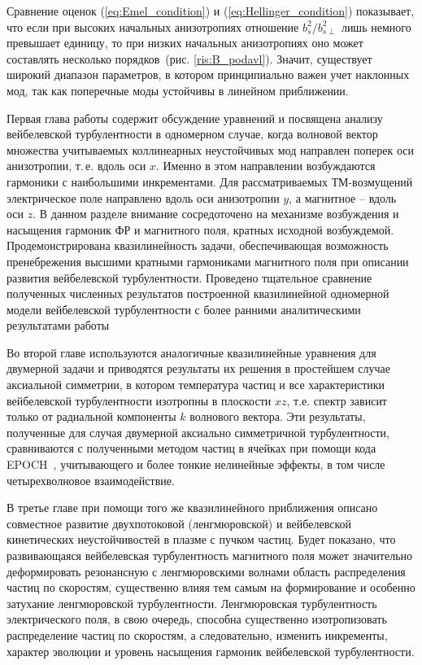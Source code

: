 Сравнение оценок (\ref{eq:Emel_condition}) и (\ref{eq:Hellinger_condition}) показывает, что если при высоких начальных анизотропиях отношение $ b_{s}^2/ b_{s\perp}^2$ лишь немного превышает единицу, то при низких начальных анизотропиях оно может составлять несколько порядков~(рис. \ref{ris:B_podavl}). Значит, существует широкий диапазон параметров, в котором принципиально важен учет наклонных мод, так как поперечные моды устойчивы в линейном приближении.

Первая глава работы содержит обсуждение уравнений и посвящена анализу вейбелевской турбулентности в одномерном случае, когда волновой вектор множества учитываемых коллинеарных неустойчивых мод направлен поперек оси анизотропии, т.\,е. вдоль оси $x$. Именно в этом направлении возбуждаются гармоники с наибольшими инкрементами. Для рассматриваемых ТМ-возмущений электрическое поле направлено вдоль оси анизотропии $y$, а магнитное -- вдоль оси $z$.  В данном разделе внимание сосредоточено на механизме возбуждения и насыщения гармоник ФР и магнитного поля, кратных исходной возбуждемой. Продемонстрирована квазилинейность задачи, обеспечивающая возможность пренебрежения высшими кратными гармониками магнитного поля при описании развития вейбелевской турбулентности. Проведено тщательное сравнение полученных численных результатов построенной квазилинейной одномерной модели вейбелевской турбулентности с более ранними аналитическими результатами работы~\cite{Pokhotelov2011}

Во второй главе используются аналогичные квазилинейные уравнения для двумерной задачи и приводятся результаты их решения в простейшем случае аксиальной симметрии, в котором температура частиц и все характеристики вейбелевской турбулентности изотропны в плоскости $xz$, т.е. спектр зависит только от радиальной компоненты $k$ волнового вектора. Эти результаты, полученные для случая двумерной аксиально симметричной турбулентности, сравниваются с полученными методом частиц в ячейках при помощи кода EPOCH~\cite{Arber2015}, учитывающего и более тонкие нелинейные эффекты, в том числе четырехволновое взаимодействие. 

В третье главе при помощи того же квазилинейного приближения описано совместное развитие двухпотоковой (ленгмюровской) и вейбелевской кинетических неустойчивостей в плазме с пучком частиц. Будет показано, что развивающаяся вейбелевская турбулентность магнитного поля может значительно деформировать резонансную с ленгмюровскими волнами область распределения частиц по скоростям, существенно влияя тем самым на формирование и особенно затухание ленгмюровской турбулентности. Ленгмюровская турбулентность электрического поля, в свою очередь, способна существенно изотропизовать распределение частиц по скоростям, а следовательно, изменить инкременты, характер эволюции и уровень насыщения гармоник вейбелевской турбулентности.

